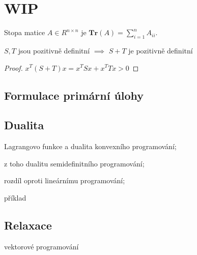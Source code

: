 \section*{WIP}

Stopa matice $A \in R^{n \times n}$ je $\textbf{Tr}(A) = \sum_{i=1}^n A_{ii}$.

\begin{vt}
$S, T$ jsou pozitivně definitní $\implies$ $S + T$ je pozitivně definitní
\end{vt}

\begin{proof}
$x^T (S+T) x = x^T S x + x^T T x > 0$
\end{proof}

\subsection*{Formulace primární úlohy}


\subsection*{Dualita}
\noindent Lagrangovo funkce a dualita konvexního programování;

\noindent z toho dualitu semidefinitního programování;

\noindent rozdíl oproti lineárnímu programování;

\noindent příklad

\subsection*{Relaxace}
\noindent vektorové programování

